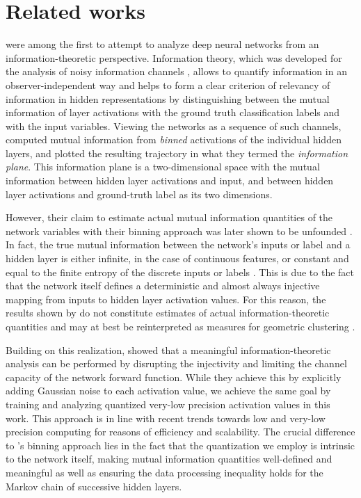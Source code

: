 \documentclass[10pt]{article}
\theoremstyle{definition}
\theoremstyle{plain}
\begin{document}
\section{Related works}
\label{sec:related}

\citet{tishby_deep_2015} were among the first to attempt to analyze deep neural networks from an information-theoretic perspective. Information theory, which was developed for the analysis of noisy information channels \citep{shannon_mathematical_1948}, allows to quantify information in an observer-independent way and helps to form a clear criterion of relevancy of information in hidden representations by distinguishing between the mutual information of layer activations with the ground truth classification labels and with the input variables. Viewing the networks as a sequence of such channels, \citet{shwartz-ziv_opening_2017} computed mutual information from \textit{binned} activations of the individual hidden layers, and plotted the resulting trajectory in what they termed the \textit{information plane}. This information plane is a two-dimensional space with the mutual information between hidden layer activations and input, and between hidden layer activations and ground-truth label as its two dimensions.

However, their claim to estimate actual mutual information quantities of the network variables with their binning approach was later shown to be unfounded \citep{saxe_information_2019, goldfeld_estimating_2019}. In fact, the true mutual information between the network's inputs or label and a hidden layer is either infinite, in the case of continuous features, or constant and equal to the finite entropy of the discrete inputs or labels \citep{saxe_information_2019, goldfeld_estimating_2019, geiger_information_2021}. This is due to the fact that the network itself defines a deterministic and almost always injective mapping from inputs to hidden layer activation values.
For this reason, the results shown by \citet{shwartz-ziv_opening_2017} do not constitute estimates of actual information-theoretic quantities and may at best be reinterpreted as measures for geometric clustering \citep{goldfeld_estimating_2019, geiger_information_2021}.

Building on this realization, \citet{goldfeld_estimating_2019} showed that a meaningful information-theoretic analysis can be performed by disrupting the injectivity and limiting the channel capacity of the network forward function. While they achieve this by explicitly adding Gaussian noise to each activation value, we achieve the same goal by training and analyzing quantized very-low precision activation values in this work. This approach is in line with recent trends towards low \citep{gupta_deep_2015} and very-low precision \citep{hubara_quantized_2016} computing for reasons of efficiency and scalability. The crucial difference to \citet{shwartz-ziv_opening_2017}'s binning approach lies in the fact that the quantization we employ is intrinsic to the network itself, making mutual information quantities well-defined and meaningful as well as ensuring the data processing inequality holds for the Markov chain of successive hidden layers.
\end{document}
